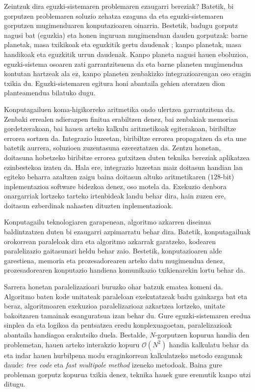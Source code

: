 Zeintzuk dira eguzki-sistemaren problemaren ezaugarri bereziak? Batetik, bi gorputzen problemaren  soluzio zehatza ezaguna da eta eguzki-sistemaren gorputzen mugimenduaren konputazioaren oinarria. Bestetik,  badugu gorputz nagusi bat (eguzkia) eta honen inguruan mugimenduan dauden gorputzak: barne planetak, masa txikikoak eta eguzkitik gertu daudenak ; kanpo planetak, masa handikoak eta eguzkitik urrun daudenak. Kanpo planeta nagusi hauen eboluzioa, eguzki-sistema osoaren zati garrantzitsuena da eta barne planeten mugimendua kontutan hartzeak ala ez, kanpo planeten zenbakizko integrazioarengan oso eragin txikia du. Eguzki-sistemaren egitura honi abantaila gehien ateratzen dion planteamendua bilatuko dugu.
  
Konputagailuen koma-higikorreko aritmetika ondo ulertzea garrantzitsua da. Zenbaki errealen adierazpen finitua erabiltzen denez, bai zenbakiak memorian gordetzerakoan, bai hauen arteko kalkulu aritmetikoak egiterakoan, biribiltze errorea sortzen da. Integrazio luzeetan, biribiltze errorea propagatzen da eta une batetik aurrera, soluzioen zuzentasuna ezereztatzen da. Zentzu honetan, doitasuna hobetzeko biribitze errorea gutxitzen duten teknika bereziak aplikatzea ezinbestekoa izaten da. Hala ere, integrazio luzeetan maiz doitasun handian lan egiteko beharra azaltzen zaigu baina doitasun altuko aritmetikaren ($128$-bit) inplementazioa software bidezkoa denez, oso motela da. Exekuzio denbora onargarriak lortzeko tarteko irtenbideak landu behar dira, hain zuzen ere, doitasun ezberdinak nahasten dituzten inplementazioak.       

Konputagailu teknologiaren garapenean, algoritmo azkarren diseinua baldintzatzen duten bi ezaugarri azpimarratu behar dira. Batetik, konputagailuak orokorrean paraleloak dira eta algoritmo azkarrak garatzeko, kodearen paralelizazio gaitasunari heldu behar zaio. Bestetik, konputazioaren alde garestiena, memoria eta prozesadorearen arteko datu mugimendua denez, prozesadorearen konputazio handiena komunikazio txikienarekin lortu behar da. 

Sarrera honetan paralelizazioari buruzko ohar batzuk ematea komeni da. Algoritmo baten kode unitateak paraleloan exekutatzeak badu gainkarga bat eta beraz,  algoritmoaren exekuzioa paralelizazioaz azkartzea lortzeko,  unitate bakoitzaren tamainak esanguratsua izan behar du. Gure eguzki-sistemaren eredua sinplea da eta logikoa da pentsatzea eredu konplexuagoetan, paralelizazioak abantaila handiagoa erakutsiko duela. Bestalde, $N$-gorputzen kopurua handia den problemetan, hauen arteko interakzio kopuru $\mathcal{O}(N^2)$ handia kalkulatu behar da eta indar hauen hurbilpena modu eraginkorrean kalkulatzeko metodo ezagunak daude: \textit {tree code}\cite{Barnes1986} eta \textit {fast multipole method}\cite{Carrier1988} izeneko metodoak. Baina gure probleman gorputz kopurua txikia denez, teknika hauek gure eremutik kanpo utzi ditugu. 


